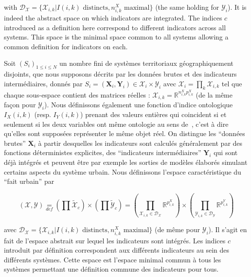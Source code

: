{with $\mathcal{D}_{\mathcal{X}}=\{\mathcal{X}_{i,k}|I(i,k)\textrm{ distincts},n_{i,k}^{X}\mbox{ maximal}\}$
(the same holding for $\mathcal{Y}_{i}$). It is indeed the abstract space on which indicators are integrated. The indices $c$ introduced as a definition here correspond to different indicators across all systems. This space is the minimal space common to all systems allowing a common definition for indicators on each.
}{
Soit $(S_{i})_{1\leq i\leq N}$ un nombre fini de systèmes territoriaux géographiquement disjoints, %
que nous supposons décrits par les données brutes et des indicateurs intermédiaires, donnés par $S_{i}=(\mathbf{X}_{i},\mathbf{Y}_{i})\in\mathcal{X}_{i}\times\mathcal{Y}_{i}$ avec $\mathcal{X}_{i}=\prod_{k}\mathcal{X}_{i,k}$ tel que chaque sous-espace contient des matrices réelles : $\mathcal{X}_{i,k}=\mathbb{R}^{n_{i,k}^{X}p_{i,k}^{X}}$ (de la même façon pour $\mathcal{Y}_{i}$). Nous définissons également une fonction d'indice ontologique $I_{X}(i,k)$ (resp. $I_{Y}(i,k)$) prenant des valeurs entières qui coincident si et seulement si les deux variables ont même ontologie au sens de~\cite{livet2010}, c'est à dire qu'elles sont supposées représenter le même objet réel. On distingue les ``données brutes'' $\mathbf{X}_{i}$ à partir desquelles les indicateurs sont calculés généralement par des fonctions déterministes explicites, %
 des ``indicateurs intermédiaires'' $\mathbf{Y}_{i}$ qui sont déjà intégrés et peuvent être par exemple les sorties de modèles élaborés simulant certains aspects du système urbain. Nous définissons l'espace caractéristique du ``fait urbain'' par


\begin{equation}
(\mathcal{X},\mathcal{Y}) \underset{def}{=} \left(\prod\tilde{\mathcal{X}}_{c}\right)\times\left(\prod\tilde{\mathcal{Y}}_{c}\right) = \left(\prod_{\mathcal{X}_{i,k}\in\mathcal{D}_{\mathcal{X}}}\mathbb{R}^{p_{i,k}^{X}}\right)\times\left(\prod_{\mathcal{Y}_{i,k}\in\mathcal{D}_{\mathcal{Y}}}\mathbb{R}^{p_{i,k}^{Y}}\right)
\end{equation}

avec $\mathcal{D}_{\mathcal{X}}=\{\mathcal{X}_{i,k}|I(i,k)\textrm{ distincts},n_{i,k}^{X}\mbox{ maximal}\}$
(de même pour $\mathcal{Y}_{i}$). Il s'agit en fait de l'espace abstrait sur lequel les indicateurs sont intégrés. Les indices $c$ introduit par définition correspondent aux différents indicateurs au sein des différents systèmes. Cette espace est l'espace minimal commun à tous les systèmes permettant une définition commune des indicateurs pour tous.
}



